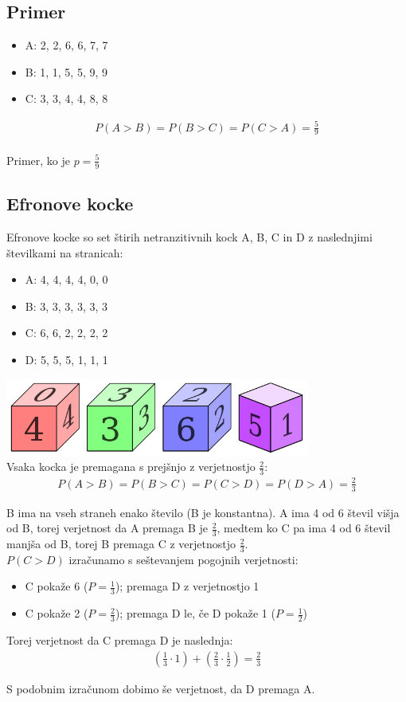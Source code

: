 \documentclass[12pt,a4paper]{amsart}
\begin{document}
\subsection{Primer}
\begin{itemize}
    \item A: 2, 2, 6, 6, 7, 7
    \item B: 1, 1, 5, 5, 9, 9
    \item C: 3, 3, 4, 4, 8, 8
\end{itemize}
\begin{align*}
    P(A > B) = P(B > C) = P(C > A) = \frac{5}{9}
\end{align*}
\\Primer, ko je $p=\frac{5}{9}$

\subsection{Efronove kocke}
Efronove kocke so set štirih netranzitivnih kock A, B, C in D z naslednjimi številkami na stranicah:
\begin{itemize}
    \item A: 4, 4, 4, 4, 0, 0
    \item B: 3, 3, 3, 3, 3, 3
    \item C: 6, 6, 2, 2, 2, 2
    \item D: 5, 5, 5, 1, 1, 1
\end{itemize}
\includegraphics[width=100mm]{Efron's dice.png}
\\Vsaka kocka je premagana s prejšnjo z verjetnostjo $\frac{2}{3}$:
\begin{align*}
   P(A>B) = P(B>C) = P(C>D) = P(D>A) = \frac{2}{3}
\end{align*}
 
B ima na vseh straneh enako število (B je konstantna). A ima 4 od 6 števil višja od B, torej verjetnost da A premaga B je $\frac{2}{3}$, medtem ko
C pa ima 4 od 6 števil manjša od B, torej B premaga C z verjetnostjo $\frac{2}{3}$.
\\$P(C>D)$ izračunamo s seštevanjem pogojnih verjetnosti:
\begin{itemize}
    \item C pokaže 6 ($P = \frac{1}{3}$); premaga D z verjetnostjo 1
    \item C pokaže 2 ($P = \frac{2}{3}$); premaga D le, če D pokaže 1 ($P = \frac{1}{2}$)
\end{itemize}

Torej verjetnost da C premaga D je naslednja:
\begin{align*}
    (\frac{1}{3}\cdot 1)+(\frac{2}{3}\cdot\frac{1}{2}) = \frac{2}{3}
\end{align*}

S podobnim izračunom dobimo še verjetnost, da D premaga A.

 

\end{document}
